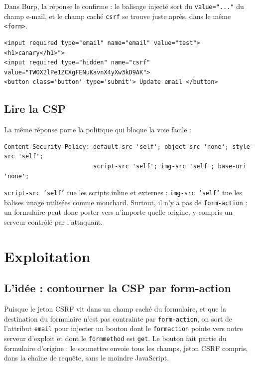 \documentclass[11pt,a4paper]{article}
\begin{document}
Dans Burp, la réponse le confirme : le balisage injecté sort du
\texttt{value="..."} du champ e-mail, et le champ caché \texttt{csrf} se trouve
juste après, dans le même \texttt{<form>}.

\begin{lstlisting}
<input required type="email" name="email" value="test"><h1>canary</h1>">
<input required type="hidden" name="csrf" value="TWOX2lPe1ZCXgFENuKavnX4yXw3kD9AK">
<button class='button' type='submit'> Update email </button>
\end{lstlisting}

\subsection{Lire la CSP}
La même réponse porte la politique qui bloque la voie facile :

\begin{lstlisting}
Content-Security-Policy: default-src 'self'; object-src 'none'; style-src 'self';
                         script-src 'self'; img-src 'self'; base-uri 'none';
\end{lstlisting}

\texttt{script-src 'self'} tue les scripts inline et externes ;
\texttt{img-src 'self'} tue les balises image utilisées comme mouchard.
Surtout, il n'y a pas de \texttt{form-action} : un formulaire peut donc poster
vers n'importe quelle origine, y compris un serveur contrôlé par l'attaquant.


\section{Exploitation}

\subsection{L'idée : contourner la CSP par form-action}
Puisque le jeton CSRF vit dans un champ caché du formulaire, et que la
destination du formulaire n'est pas contrainte par \texttt{form-action}, on
sort de l'attribut \texttt{email} pour injecter un bouton dont le
\texttt{formaction} pointe vers notre serveur d'exploit et dont le
\texttt{formmethod} est \texttt{get}. Le bouton fait partie du formulaire
d'origine : le soumettre envoie tous les champs, jeton CSRF compris, dans la
chaîne de requête, sans le moindre JavaScript.
\end{document}
